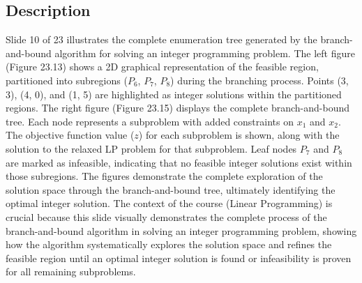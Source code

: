 \documentclass{article}%
\begin{document}
\subsection{Description}%
Slide 10 of 23 illustrates the complete enumeration tree generated by the branch-and-bound algorithm for solving an integer programming problem. The left figure (Figure 23.13) shows a 2D graphical representation of the feasible region, partitioned into subregions ($P_6$, $P_7$, $P_8$) during the branching process.  Points (3, 3), (4, 0), and (1, 5) are highlighted as integer solutions within the partitioned regions. The right figure (Figure 23.15) displays the complete branch-and-bound tree. Each node represents a subproblem with added constraints on $x_1$ and $x_2$. The objective function value ($z$) for each subproblem is shown, along with the solution to the relaxed LP problem for that subproblem. Leaf nodes $P_7$ and $P_8$ are marked as infeasible, indicating that no feasible integer solutions exist within those subregions. The figures demonstrate the complete exploration of the solution space through the branch-and-bound tree, ultimately identifying the optimal integer solution. The context of the course (Linear Programming) is crucial because this slide visually demonstrates the complete process of the branch-and-bound algorithm in solving an integer programming problem, showing how the algorithm systematically explores the solution space and refines the feasible region until an optimal integer solution is found or infeasibility is proven for all remaining subproblems.%
\end{document}
